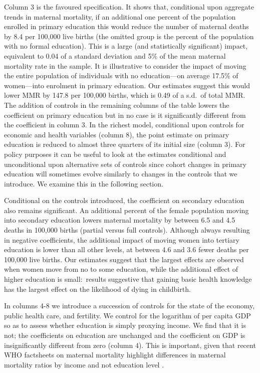 \documentclass{article}[12pt,subeqn]
\begin{document}
\begin{spacing}{1.4}
Column 3 is the favoured specification. It shows that, conditional upon 
aggregate trends in maternal mortality, if an additional one percent of the 
population enrolled in primary education this would reduce the number of maternal 
deaths by 8.4 per 100,000 live births (the omitted group is the percent of the
population with no formal education).  This is a large (and statistically
significant) impact, equivalent to 0.04 of a standard deviation and 5\% of the
mean maternal mortality rate in the sample. It is illustrative to consider the
impact of moving the entire population of individuals with no education---on
average 17.5\% of women---into enrolment in primary education. Our estimates
suggest this would lower MMR by 147.8 per 100,000 births, which is 0.49 of a
s.d.\ of total MMR. The addition of controls in the remaining columns of the
table lowers the coefficient on primary education but in no case is it
significantly different from the coefficient in column 3. In the richest model,
conditional upon controls for economic and health variables (column 8), the
point estimate on primary education is reduced to almost three quarters of its 
initial size (column 3). For policy purposes it can be useful to look at the 
estimates conditional and unconditional upon alternative sets of controls since 
cohort changes in primary education will sometimes evolve similarly to changes in 
the controls that we introduce. We examine this in the following section.

Conditional on the controls introduced, the coefficient on secondary education
also remains significant. An additional percent of the female population moving
into secondary education lowers maternal mortality by between 6.5 and 4.5 deaths
in 100,000 births (partial versus full controls).  Although always resulting
in negative coefficients, the additional impact of moving women into tertiary
education is lower than all other levels, at between 4.6 and 3.6 fewer deaths per
100,000 live births.  Our estimates suggest that the largest effects are observed
when women move from no to some education, while
the additional effect of higher education is small:\ results suggestive that
gaining basic health knowledge has the largest effect on the likelihood of dying
in childbirth.

In columns 4-8 we introduce a succession of controls for the state of the
economy, public health care, and fertility. We control for the logarithm of per 
capita GDP so as to assess whether education is simply proxying income. We find 
that it is not; the coefficients on education are unchanged and the coefficient 
on GDP is insignificantly different from zero (column 4). This is important, 
given that recent WHO factsheets on maternal mortality highlight differences in
maternal mortality ratios by income and not education level \citep{WHO2012}.


\end{spacing}
\end{document}
